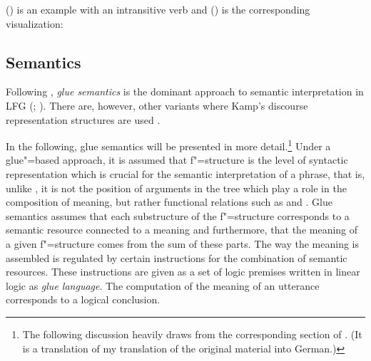 () is an example with an intransitive verb and () is the corresponding visualization:

\ea
{}
\z

\ea
{}
\hspace*{4em}
\z
{}

\subsection{Semantics}
\label{lfg-semantics}
\label{glue-semantics}

Following \citet[--92]{Dalrymple2006a}, \emph{glue semantics} is the dominant approach to semantic interpretation in LFG
(\citealp*{DLS93a-u}; \citealp[Chapter~8]{Dalrymple2001a-u}). There are, however, other variants
where Kamp's discourse representation structures \citep{KR93a} are used \citep{FR83b,FR83a}.

In the following, glue semantics will be presented in more detail.\footnote{%
The following discussion heavily draws from the corresponding section of . (It
is a translation of my translation of the original material into German.)
}
Under a glue"=based approach, it is assumed that f"=structure is the level of syntactic representation which is crucial for the semantic interpretation of
a phrase, that is, unlike \gbt, it is not the position of arguments in the tree which play a role in the composition of meaning, but rather functional relations such as 
\lfgsubj and \lfgobj. Glue semantics assumes that each substructure of the f"=structure corresponds to a semantic resource connected to a meaning and furthermore, that the meaning
of a given f"=structure comes from the sum of these parts. The way the meaning is assembled is
regulated by certain instructions for the combination of semantic resources. These instructions are given
as a set of logic premises written in linear logic as \emph{glue language}. The computation of the meaning of an utterance corresponds to a logical conclusion.

